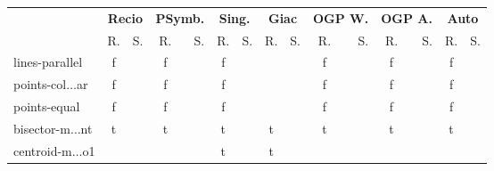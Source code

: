 {\scriptsize
\begin{longtable}{|l|*{7}{cr|}}
\hline
{\multirow{2}{*}{\bf Test}}
& \multicolumn{2}{c|}{\bf Recio}
& \multicolumn{2}{c|}{\bf PSymb.}
& \multicolumn{2}{c|}{\bf Sing.}
& \multicolumn{2}{c|}{\bf Giac}
& \multicolumn{2}{c|}{\bf OGP W.}
& \multicolumn{2}{c|}{\bf OGP A.}
& \multicolumn{2}{c|}{\bf Auto}
\\
&R.&S.
&R.&S.
&R.&S.
&R.&S.
&R.&S.
&R.&S.
&R.&S.
\\ \hline
\cellcolor{blue!10}lines-parallel 
& \cellcolor{green!60}f & \cellcolor{green!60}{\bf 6} 
& \cellcolor{green!50}f & \cellcolor{green!50}{ 31} 
& \cellcolor{green!50}f & \cellcolor{green!50}{ 45} 
& \cellcolor{yellow!25} & \cellcolor{yellow!25}{ 257} 
& \cellcolor{green!40}f & \cellcolor{green!40}{ 62} 
& \cellcolor{green!40}f & \cellcolor{green!40}{\sl 76} 
& \cellcolor{green!60}f & \cellcolor{green!60}{ 6} 
\\ \hline
\cellcolor{blue!10}points-col$\ldots$ar 
& \cellcolor{green!60}f & \cellcolor{green!60}{\bf 4} 
& \cellcolor{green!60}f & \cellcolor{green!60}{ 12} 
& \cellcolor{green!50}f & \cellcolor{green!50}{ 27} 
& \cellcolor{yellow!25} & \cellcolor{yellow!25}{ 238} 
& \cellcolor{green!40}f & \cellcolor{green!40}{ 61} 
& \cellcolor{green!40}f & \cellcolor{green!40}{\sl 79} 
& \cellcolor{green!60}f & \cellcolor{green!60}{ 5} 
\\ \hline
\cellcolor{blue!10}points-equal 
& \cellcolor{green!60}f & \cellcolor{green!60}{\bf 7} 
& \cellcolor{green!60}f & \cellcolor{green!60}{ 11} 
& \cellcolor{green!40}f & \cellcolor{green!40}{\sl 97} 
& \cellcolor{yellow!25} & \cellcolor{yellow!25}{ 232} 
& \cellcolor{green!40}f & \cellcolor{green!40}{ 63} 
& \cellcolor{green!40}f & \cellcolor{green!40}{ 71} 
& \cellcolor{green!60}f & \cellcolor{green!60}{ 7} 
\\ \hline
\cellcolor{blue!10}bisector-m$\ldots$nt 
& \cellcolor{green!60}t & \cellcolor{green!60}{\bf 3} 
& \cellcolor{green!60}t & \cellcolor{green!60}{ 19} 
& \cellcolor{green!40}t & \cellcolor{green!40}{ 94} 
& \cellcolor{green!30}t & \cellcolor{green!30}{\sl 248} 
& \cellcolor{green!40}t & \cellcolor{green!40}{ 80} 
& \cellcolor{green!40}t & \cellcolor{green!40}{ 85} 
& \cellcolor{green!60}t & \cellcolor{green!60}{ 3} 
\\ \hline
\cellcolor{blue!10}centroid-m$\ldots$o1 
& \cellcolor{yellow!25} & \cellcolor{yellow!25}{ 2} 
& \cellcolor{yellow!25} & \cellcolor{yellow!25}{ 5} 
& \cellcolor{green!50}t & \cellcolor{green!50}{\bf 38} 
& \cellcolor{green!30}t & \cellcolor{green!30}{ 252} 

\end{longtable}}
